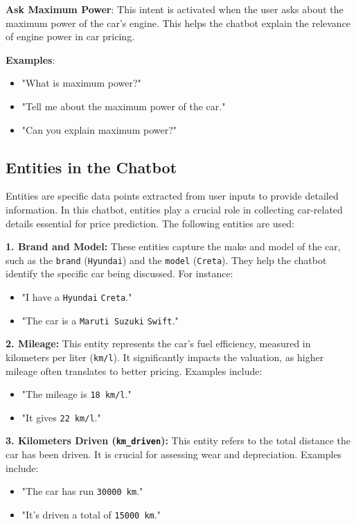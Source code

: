 \documentclass[a4paper,12pt]{article}
\begin{document}
\textbf{Ask Maximum Power}: This intent is activated when the user asks about the maximum power of the car's engine. This helps the chatbot explain the relevance of engine power in car pricing.

\textbf{Examples}:
\begin{itemize}
    \item "What is maximum power?"
    \item "Tell me about the maximum power of the car."
    \item "Can you explain maximum power?"
\end{itemize}


\subsection{Entities in the Chatbot}

Entities are specific data points extracted from user inputs to provide detailed information. In this chatbot, entities play a crucial role in collecting car-related details essential for price prediction. The following entities are used:

\textbf{1. Brand and Model:} These entities capture the make and model of the car, such as the \texttt{brand} (\texttt{Hyundai}) and the \texttt{model} (\texttt{Creta}). They help the chatbot identify the specific car being discussed. For instance:
\begin{itemize}
	\item "I have a \texttt{Hyundai} \texttt{Creta}."
	\item "The car is a \texttt{Maruti Suzuki} \texttt{Swift}."
\end{itemize}

\textbf{2. Mileage:} This entity represents the car's fuel efficiency, measured in kilometers per liter (\texttt{km/l}). It significantly impacts the valuation, as higher mileage often translates to better pricing. Examples include:
\begin{itemize}
	\item "The mileage is \texttt{18 km/l}."
	\item "It gives \texttt{22 km/l}."
\end{itemize}

\textbf{3. Kilometers Driven (\texttt{km\_driven}):} This entity refers to the total distance the car has been driven. It is crucial for assessing wear and depreciation. Examples include:
\begin{itemize}
	\item "The car has run \texttt{30000 km}."
	\item "It’s driven a total of \texttt{15000 km}."
\end{itemize}
\end{document}
